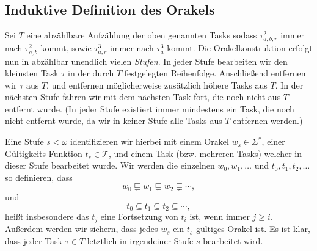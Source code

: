 \subsection*{Induktive Definition des Orakels}

Sei $T$ eine abzählbare Aufzählung der oben genannten Tasks sodass $\tau^2_{a,b,r}$ immer nach $\tau^2_{a,b}$ kommt, sowie $\tau^3_{a,r}$ immer nach $\tau^3_a$ kommt.
Die Orakelkonstruktion erfolgt nun in abzählbar unendlich vielen \emph{Stufen}. In jeder Stufe bearbeiten wir den kleinsten Task $\tau$ in der durch $T$ festgelegten Reihenfolge. Anschließend entfernen wir $\tau$ aus $T$, und entfernen möglicherweise zusätzlich höhere Tasks aus $T$.
In der nächsten Stufe fahren wir mit dem nächsten Task fort, die noch nicht aus $T$ entfernt wurde. (In jeder Stufe existiert immer mindestens ein Task, die noch nicht entfernt wurde, da wir in keiner Stufe alle Tasks aus $T$ entfernen werden.)

Eine Stufe $s<\omega$ identifizieren wir hierbei mit einem Orakel $w_s\in\Sigma^*$, einer Gültigkeits-Funktion $t_s\in\mathcal T$, und einem Task (bzw. mehreren Tasks) welcher in dieser Stufe bearbeitet wurde.
Wir werden die einzelnen $w_0, w_1, \dots$ und $t_0, t_1, t_2, \dots$ so definieren, dass
\[ w_0\sqsubsetneq w_1 \sqsubsetneq w_2 \sqsubsetneq \cdots, \]
und 
\[ t_0 \subseteq t_1 \subseteq t_2 \subseteq \cdots, \]
heißt insbesondere das $t_j$ eine Fortsetzung von $t_i$ ist, wenn immer $j\geq i$.
Außerdem werden wir sichern, dass jedes $w_s$ ein $t_s$-gültiges Orakel ist.
Es ist klar, dass jeder Task $\tau\in T$ letztlich in irgendeiner Stufe $s$ bearbeitet wird.


